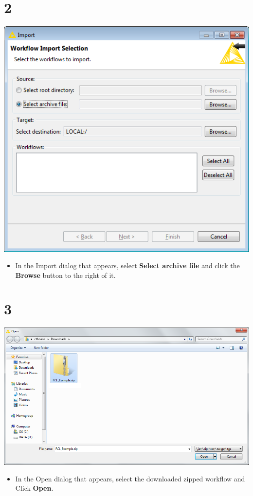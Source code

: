 \documentclass{beamer}
\begin{document}
\section{2}
\begin{frame}
	\begin{center}
  		\includegraphics[height=0.6\textheight]{2.png}
	\end{center}
	\begin{itemize}
		\item In the Import dialog that appears, select \textbf{Select archive file} and click the \textbf{Browse} button to the right of it.
	\end{itemize}
\end{frame}

\section{3}
\begin{frame}
	\begin{center}
  		\includegraphics[height=0.6\textheight]{3.png}
	\end{center}
	\begin{itemize}
		\item In the Open dialog that appears, select the downloaded zipped workflow and Click \textbf{Open}.
	\end{itemize}
\end{frame}
\end{document}
